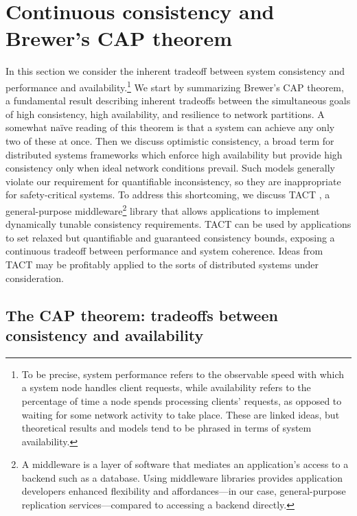 \section{Continuous consistency and Brewer's CAP theorem}

In this section we consider the inherent tradeoff between system
consistency and performance and availability.\footnote{To be precise,
system performance refers to the observable speed with which a system
node handles client requests, while availability refers to the
percentage of time a node spends processing clients' requests, as
opposed to waiting for some network activity to take place. These are
linked ideas, but theoretical results and models tend to be phrased in
terms of system availability.} We start by summarizing Brewer's CAP
theorem, a fundamental result describing inherent tradeoffs between
the simultaneous goals of high consistency, high availability, and
resilience to network partitions. A somewhat $\textrm{na\"ive}$
reading of this theorem is that a system can achieve any only two of
these at once. Then we discuss optimistic consistency, a broad term
for distributed systems frameworks which enforce high availability but
provide high consistency only when ideal network conditions
prevail. Such models generally violate our requirement for
quantifiable inconsistency, so they are inappropriate for
safety-critical systems. To address this shortcoming, we discuss TACT
\cite{2002tact}, a general-purpose middleware\footnote{A middleware is
a layer of software that mediates an application's access to a backend
such as a database. Using middleware libraries provides application
developers enhanced flexibility and affordances---in our case,
general-purpose replication services---compared to accessing a backend
directly.} library that allows applications to implement dynamically
tunable consistency requirements. TACT can be used by applications to
set relaxed but quantifiable and guaranteed consistency bounds,
exposing a continuous tradeoff between performance and system
coherence. Ideas from TACT may be profitably applied to the sorts of
distributed systems under consideration.

\subsection{The CAP theorem: tradeoffs between consistency and availability}

